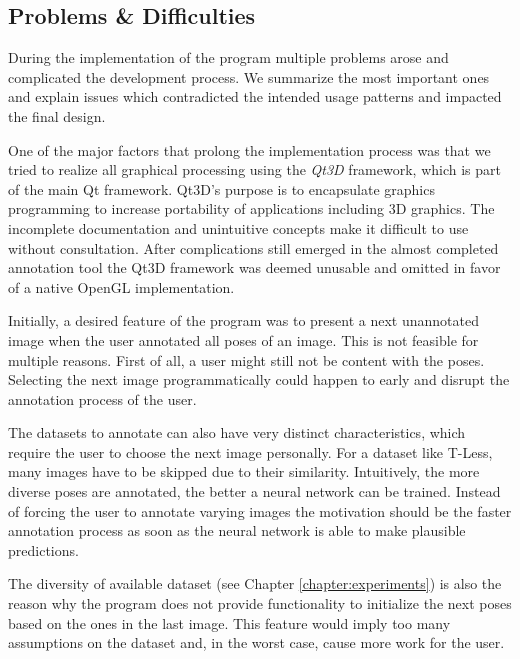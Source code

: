 \subsection{Problems \& Difficulties} \label{section:6dpat_difficulties}

During the implementation of the program multiple problems arose and complicated the development process. We summarize the most important ones and explain issues which contradicted the intended usage patterns and impacted the final design.

One of the major factors that prolong the implementation process was that we tried to realize all graphical processing using the \textit{Qt3D} framework, which is part of the main Qt framework. Qt3D's purpose is to encapsulate graphics programming to increase portability of applications including 3D graphics. The incomplete documentation and unintuitive concepts make it difficult to use without consultation. After complications still emerged in the almost completed annotation tool the Qt3D framework was deemed unusable and omitted in favor of a native OpenGL implementation.

Initially, a desired feature of the program was to present a next unannotated image when the user annotated all poses of an image. This is not feasible for multiple reasons. First of all, a user might still not be content with the poses. Selecting the next image programmatically could happen to early and disrupt the annotation process of the user.

The datasets to annotate can also have very distinct characteristics, which require the user to choose the next image personally. For a dataset like T-Less, many images have to be skipped due to their similarity. Intuitively, the more diverse poses are annotated, the better a neural network can be trained. Instead of forcing the user to annotate varying images the motivation should be the faster annotation process as soon as the neural network is able to make plausible predictions. 

The diversity of available dataset (see Chapter \ref{chapter:experiments}) is also the reason why the program does not provide functionality to initialize the next poses based on the ones in the last image. This feature would imply too many assumptions on the dataset and, in the worst case, cause more work for the user. 

